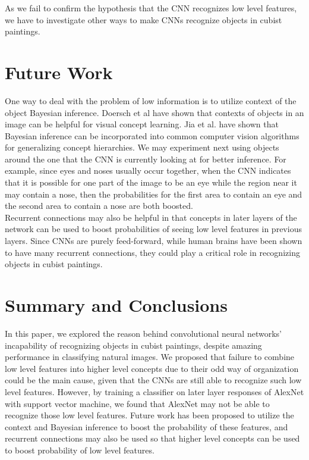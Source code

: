 \documentclass[11pt]{article}
\begin{document}
As we fail to confirm the hypothesis that the CNN recognizes low level features, we have to investigate other ways to make CNNs recognize objects in cubist paintings.

\section{Future Work}

One way to deal with the problem of low information is to utilize context of the object Bayesian inference. Doersch et al \cite{key:ContextPrediction} have shown that contexts of objects in an image can be helpful for visual concept learning. Jia et al. \cite{key:Bayesian} have shown that Bayesian inference can be incorporated into common computer vision algorithms for generalizing concept hierarchies. We may experiment next using objects around the one that the CNN is currently looking at for better inference. For example, since eyes and noses usually occur together, when the CNN indicates that it is possible for one part of the image to be an eye while the region near it may contain a nose, then the probabilities for the first area to contain an eye and the second area to contain a nose are both boosted.\\

Recurrent connections may also be helpful in that concepts in later layers of the network can be used to boost probabilities of seeing low level features in previous layers. Since CNNs are purely feed-forward, while human brains have been shown to have many recurrent connections, they could play a critical role in recognizing objects in cubist paintings.

\section{Summary and Conclusions}
In this paper, we explored the reason behind convolutional neural networks' incapability of recognizing objects in cubist paintings, despite amazing performance in classifying natural images. We proposed that failure to combine low level features into higher level concepts due to their odd way of organization could be the main cause, given that the CNNs are still able to recognize such low level features. However, by training a classifier on later layer responses of AlexNet with support vector machine, we found that AlexNet may not be able to recognize those low level features. Future work has been proposed to utilize the context and Bayesian inference to boost the probability of these features, and recurrent connections may also be used so that higher level concepts can be used to boost probability of low level features.
\end{document}
